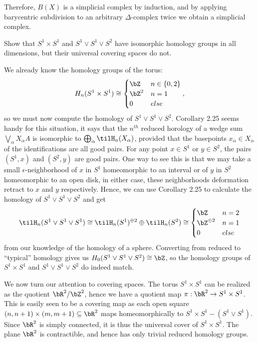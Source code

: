 \begin{homework}[e]
\begin{prf}
    Therefore, $B(X)$ is a simplicial complex by induction, and by applying barycentric subdivision to an arbitrary $\Delta$-complex twice we obtain a simplicial complex.
  \end{prf}
   Show that $S^1\times S^1$ and $S^1 \vee S^1 \vee S^2$ have isomorphic homology groups in all dimensions, but their universal covering spaces do not.
  \begin{prf}
    We already know the homology groups of the torus:
    \begin{align*}
      H_n(S^1\times S^1) \cong
      \begin{cases}
        \bZ & n \in \{0,2\} \\
        \bZ^2 & n = 1 \\
        0 & else
      \end{cases},
    \end{align*}
    so we must now compute the homology of $S^1\vee S^1\vee S^2$. Corollary 2.25 seems handy for this situation, it says that the $n^{th}$ reduced horology of a wedge sum $\bigvee_\alpha X_\alpha A$ is isomorphic to $\bigoplus_\alpha \tilH_n(X_\alpha)$, provided that the basepoints $x_\alpha \in X_\alpha$ of the identifications are all good pairs. For any point $x \in S^1$ or $y \in S^2$, the pairs $(S^1,x)$ and $(S^2,y)$ are good pairs. One way to see this is that we may take a small $\epsilon$-neighborhood of $x$ in $S^1$ homeomorphic to an interval or of $y$ in $S^2$ homeomorphic to an open disk, in either case, these neighborhoods deformation retract to $x$ and $y$ respectively. Hence, we can use Corollary 2.25 to calculate the homology of $S^1\vee S^1\vee S^2$ and get
    \begin{align*}
      \tilH_{n}(S^1\vee S^1 \vee S^1) \cong \tilH_n(S^1)^{\oplus 2} \oplus \tilH_n(S^2) \cong 
      \begin{cases}
        \bZ & n = 2 \\
        \bZ^{\oplus 2} & n = 1 \\
        0 & else
      \end{cases}
    \end{align*}
    from our knowledge of the homology of a sphere. Converting from reduced to ``typical'' homology gives us $H_0(S^1\vee S^1\vee S^2) \cong \bZ$, so the homology groups of $S^1\times S^1$ and $S^1\vee S^1\vee S^2$ do indeed match.

    \bigskip

    We now turn our attention to covering spaces. The torus $S^1\times S^1$ can be realized as the quotient $\bR^2/\bZ^2$, hence we have a quotient map $\pi:\bR^2 \to S^1\times S^1$. This is easily seen to be a covering map as each open square $(n,n+1)\times (m,m+1)\subseteq \bR^2$ maps homeomorphically to $S^1\times S^1 - (S^1\vee S^1)$. Since $\bR^2$ is simply connected, it is thus the universal cover of $S^1\times S^1$. The plane $\bR^2$ is contractible, and hence has only trivial reduced homology groups.


\end{prf}
\end{homework}
